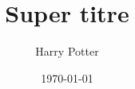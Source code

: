 \documentclass{memoir}
\begin{document}
\frontmatter
\title{Super titre}
\author{Harry Potter}
\date{\today}
\maketitle
\mainmatter




\backmatter
\printbibliography
\end{document}
